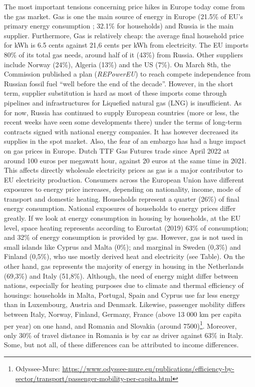 \documentclass[
  9pt,
  a4paper,
  DIV=11,
  numbers=noendperiod]{scrartcl}
\begin{document}
The most important tensions concerning price hikes in Europe today come
from the gas market. Gas is one the main source of energy in Europe
(21.5\% of EU's primary energy consumption ; 32.1\% for households) and
Russia is the main supplier. Furthermore, Gas is relatively cheap: the
average final household price for kWh is 6.5 cents against 21,6 cents
per kWh from electricity. The EU imports 80\% of its total gas needs,
around half of it (43\%) from Russia. Other suppliers include Norway
(24\%), Algeria (13\%) and the US (7\%). On March 8th, the Commission
published a plan (\emph{REPowerEU}) to reach compete independence from
Russian fossil fuel ``well before the end of the decade''. However, in
the short term, supplier substitution is hard as most of these imports
come through pipelines and infrastructures for Liquefied natural gas
(LNG) is insufficient. As for now, Russia has continued to supply
European countries (more or less, the recent weeks have seen some
developments there) under the terms of long-term contracts signed with
national energy companies. It has however decreased its supplies in the
spot market. Also, the fear of an embargo has had a huge impact on gas
prices in Europe. Dutch TTF Gas Futures trade since April 2022 at around
100 euros per megawatt hour, against 20 euros at the same time in 2021.
This affects directly wholesale electricity prices as gas is a major
contributor to EU electricity production. Consumers across the European
Union have different exposures to energy price increases, depending on
nationality, income, mode of transport and domestic heating. Households
represent a quarter (26\%) of final energy consumption. National
exposures of households to energy prices differ greatly. If we look at
energy consumption in housing by households, at the EU level, space
heating represents according to Eurostat (2019) 63\% of consumption; and
32\% of energy consumption is provided by gas. However, gas is not used
in small islands like Cyprus and Malta (0\%); and marginal in Sweden
(0,3\%) and Finland (0,5\%), who use mostly derived heat and electricity
(see Table). On the other hand, gas represents the majority of energy in
housing in the Netherlands (69,3\%) and Italy (51,8\%). Although, the
need of energy might differ between nations, especially for heating
purposes due to climate and thermal efficiency of housings: households
in Malta, Portugal, Spain and Cyprus use far less energy than in
Luxembourg, Austria and Denmark. Likewise, passenger mobility differs
between Italy, Norway, Finland, Germany, France (above 13 000 km per
capita per year) on one hand, and Romania and Slovakia (around
7500)\footnote{Odyssee-Mure:
  \url{https://www.odyssee-mure.eu/publications/efficiency-by-sector/transport/passenger-mobility-per-capita.html}}.
Moreover, only 30\% of travel distance in Romania is by car as driver
against 63\% in Italy. Some, but not all, of these differences can be
attributed to income differences.
\end{document}
